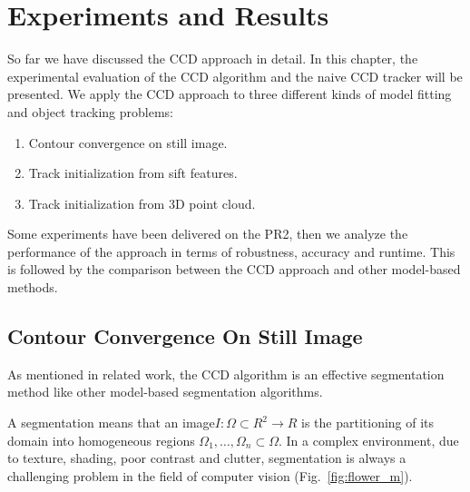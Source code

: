 \chapter{Experiments and Results}
\label{chapter:experiments}

So far we have discussed the CCD approach in detail. In this chapter,
the experimental evaluation of the CCD algorithm and the naive CCD
tracker will be presented. We apply the CCD approach to three
different kinds of model fitting and object tracking problems:

\begin{enumerate}
\item Contour convergence on still image.
\item Track initialization from sift features.
\item Track initialization from 3D point cloud.
\end{enumerate}

Some experiments have been delivered on the PR2, then we analyze the performance
of the approach in terms of robustness, accuracy and runtime. This is
followed by the comparison between the CCD approach and  other
model-based methods.



\section{Contour Convergence On Still Image}
\label{sec:ES}

As mentioned in related work, the CCD algorithm is an effective
segmentation method like other model-based segmentation algorithms.

A segmentation means that an image$I: \Omega \subset R^2 \longrightarrow R$
is the partitioning of its domain into homogeneous regions
$\Omega_1,\ldots, \Omega_n \subset \Omega$. In a complex environment,
due to texture, shading, poor contrast and clutter, segmentation is
always a challenging problem in the field of computer
vision (Fig.~\ref{fig:flower_m}).

